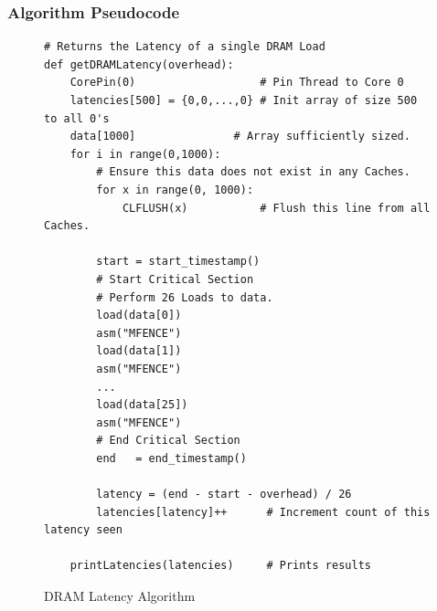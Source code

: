 \documentclass[bsc,frontabs,twoside,singlespacing,parskip,deptreport]{infthesis}     %
\begin{document}
\subsubsection{Algorithm Pseudocode}
\begin{figure}[h!]
    \begin{verbatim}
# Returns the Latency of a single DRAM Load
def getDRAMLatency(overhead):
    CorePin(0)                   # Pin Thread to Core 0
    latencies[500] = {0,0,...,0} # Init array of size 500 to all 0's
    data[1000]               # Array sufficiently sized.    
    for i in range(0,1000):
        # Ensure this data does not exist in any Caches.
        for x in range(0, 1000):
            CLFLUSH(x)           # Flush this line from all Caches.
            
        start = start_timestamp()
        # Start Critical Section
        # Perform 26 Loads to data.
        load(data[0])
        asm("MFENCE")
        load(data[1])
        asm("MFENCE")
        ...
        load(data[25])
        asm("MFENCE")
        # End Critical Section
        end   = end_timestamp()
        
        latency = (end - start - overhead) / 26
        latencies[latency]++      # Increment count of this latency seen
        
    printLatencies(latencies)     # Prints results
    \end{verbatim}
    \caption{DRAM Latency Algorithm}
    \label{fig:dram-lat-algo}
\end{figure}
\end{document}
